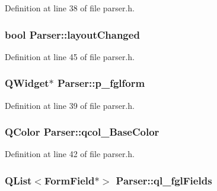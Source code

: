 Definition at line 38 of file parser.h.

\hypertarget{classParser_a8088fac11586b6de2df5ed1720f7a943}{
\subsubsection[{layoutChanged}]{\setlength{\rightskip}{0pt plus 5cm}bool {\bf Parser::layoutChanged}}}
\label{classParser_a8088fac11586b6de2df5ed1720f7a943}


Definition at line 45 of file parser.h.

\hypertarget{classParser_a8ae7aeec1e5360fa29b9976624cde0f1}{
\subsubsection[{p\_\-fglform}]{\setlength{\rightskip}{0pt plus 5cm}QWidget$\ast$ {\bf Parser::p\_\-fglform}}}
\label{classParser_a8ae7aeec1e5360fa29b9976624cde0f1}


Definition at line 39 of file parser.h.

\hypertarget{classParser_ade3fc5bc98be3edaf605694661d73693}{
\subsubsection[{qcol\_\-BaseColor}]{\setlength{\rightskip}{0pt plus 5cm}QColor {\bf Parser::qcol\_\-BaseColor}}}
\label{classParser_ade3fc5bc98be3edaf605694661d73693}


Definition at line 42 of file parser.h.

\hypertarget{classParser_a2cc0ce2919a5f45d55cab55a9e3c8b28}{
\subsubsection[{ql\_\-fglFields}]{\setlength{\rightskip}{0pt plus 5cm}QList$<${\bf FormField}$\ast$$>$ {\bf Parser::ql\_\-fglFields}}}
\label{classParser_a2cc0ce2919a5f45d55cab55a9e3c8b28}


